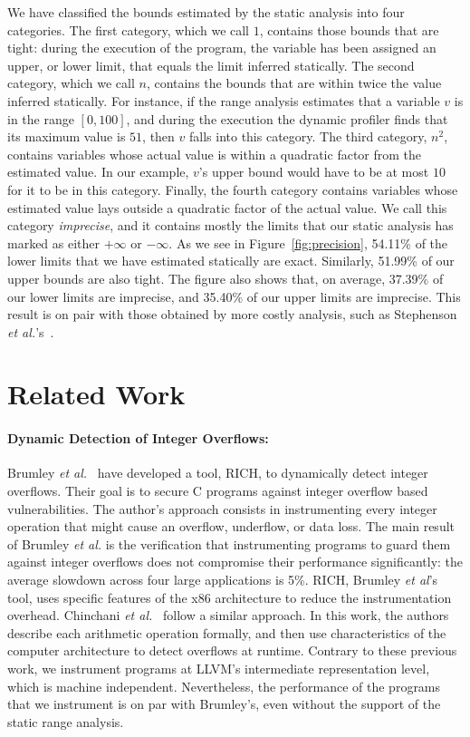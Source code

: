 \documentclass[preprint]{sigplanconf}[10pt]
\begin{document}
We have classified the bounds estimated by the static analysis into four
categories.
The first category, which we call $1$, contains those bounds that are tight:
during the execution of the program, the variable has been assigned an upper,
or lower limit, that equals the limit inferred statically.
The second category, which we call $n$, contains the bounds that are
within twice the value inferred statically.
For instance, if the range analysis estimates that a variable $v$ is in the
range $[0, 100]$, and during the execution the dynamic profiler finds that
its maximum value is $51$, then $v$ falls into this category.
The third category, $n^2$, contains variables whose actual value is within
a quadratic factor from the estimated value.
In our example, $v$'s upper bound would have to be at most $10$ for it to
be in this category.
Finally, the fourth category contains variables whose estimated value lays
outside a quadratic factor of the actual value.
We call this category {\em imprecise}, and it contains mostly the limits that
our static analysis has marked as either $+\infty$ or $-\infty$.
As we see in Figure~\ref{fig:precision}, 54.11\% of the lower limits that
we have estimated statically are exact.
Similarly, 51.99\% of our upper bounds are also tight.
The figure also shows that, on average, 37.39\% of our lower limits are
imprecise, and 35.40\% of our upper limits are imprecise.
This result is on pair with those obtained by more costly analysis, such as
Stephenson {\em et al.}'s~\cite{Stephenson00}.

\section{Related Work}
\label{sec:rel}

\noindent
\paragraph{Dynamic Detection of Integer Overflows: }
Brumley {\em et al.}~\cite{Brumley07} have developed a tool, RICH, to
dynamically detect integer overflows.
Their goal is to secure C programs against integer overflow based
vulnerabilities.
The author's approach consists in instrumenting every integer operation that
might cause an overflow, underflow, or data loss.
The main result of Brumley {\em et al.} is the verification that instrumenting
programs to guard them against integer overflows does not compromise their
performance significantly: the average slowdown across four large applications
is 5\%.
RICH, Brumley {\em et al}'s tool, uses specific features of the x86 architecture
to reduce the instrumentation overhead.
Chinchani {\em et al.}~\cite{Chinchani04} follow a similar approach.
In this work, the authors describe each arithmetic operation formally, and then
use characteristics of the computer architecture to detect overflows at
runtime.
Contrary to these previous work, we instrument programs at LLVM's intermediate
representation level, which is machine independent.
Nevertheless, the performance of the programs that we instrument is on par with
Brumley's, even without the support of the static range analysis.
\end{document}

